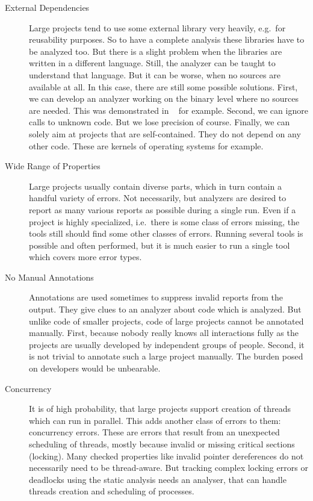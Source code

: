 \begin{description}
\item[External Dependencies] Large projects tend to use some external library
very heavily, e.g.\ for reusability purposes. So to have a complete analysis
these libraries have to be analyzed too. But there is a slight problem when
the libraries are written in a different language. Still, the analyzer can be
taught to understand that language. But it can be worse, when no sources are
available at all. In this case, there are still some possible solutions.
First, we can develop an analyzer working on the binary level where no sources
are needed.  This was demonstrated in \sage~\cite{sage} for example. Second,
we can ignore calls to unknown code. But we lose precision of course. Finally,
we can solely aim at projects that are self-contained. They do not depend on
any other code.  These are kernels of operating systems for example.

\item[Wide Range of Properties] Large projects usually contain diverse parts,
which in turn contain a handful variety of errors. Not necessarily, but
analyzers are desired to report as many various reports as possible during a
single run.  Even if a project is highly specialized, i.e.\ there is some
class of errors missing, the tools still should find some other classes of
errors. Running several tools is possible and often performed, but it is much
easier to run a single tool which covers more error types.

\item[No Manual Annotations] Annotations are used sometimes to suppress
invalid reports from the output. They give clues to an analyzer about code
which is analyzed. But unlike code of smaller projects, code of large projects
cannot be annotated manually. First, because nobody really knows all
interactions fully as the projects are usually developed by independent groups
of people.  Second, it is not trivial to annotate such a large project
manually. The burden posed on developers would be unbearable.

\item[Concurrency] It is of high probability, that large projects support
creation of threads which can run in parallel. This adds another class of
errors to them: concurrency errors. These are errors that result from an
unexpected scheduling of threads, mostly because invalid or missing critical
sections (locking).  Many checked properties like invalid pointer dereferences
do not necessarily need to be thread-aware. But tracking complex locking
errors or deadlocks using the static analysis needs an analyser, that can
handle threads creation and scheduling of processes.


\end{description}
